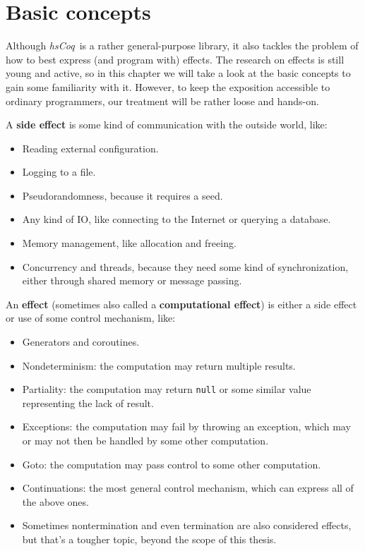 \documentclass[declaration,inz,english,shortabstract]{iithesis}
\newcommand{\libname}{\textit{hsCoq}}
\newcommand{\m}[1]{\texttt{#1}}
\begin{document}
\section{Basic concepts}

Although \libname\ is a rather general-purpose library, it also tackles the problem of how to best express (and program with) effects. The research on effects is still young and active, so in this chapter we will take a look at the basic concepts to gain some familiarity with it. However, to keep the exposition accessible to ordinary programmers, our treatment will be rather loose and hands-on.

A \textbf{side effect} is some kind of communication with the outside world, like:

\begin{itemize}
    \item Reading external configuration.
    \item Logging to a file.
    \item Pseudorandomness, because it requires a seed.
    \item Any kind of IO, like connecting to the Internet or querying a database.
    \item Memory management, like allocation and freeing.
    \item Concurrency and threads, because they need some kind of synchronization, either through shared memory or message passing.
\end{itemize}

An \textbf{effect} (sometimes also called a \textbf{computational effect}) is either a side effect or use of some control mechanism, like:

\begin{itemize}
    \item Generators and coroutines.
    \item Nondeterminism: the computation may return multiple results.
    \item Partiality: the computation may return \m{null} or some similar value representing the lack of result.
    \item Exceptions: the computation may fail by throwing an exception, which may or may not then be handled by some other computation.
    \item Goto: the computation may pass control to some other computation.
    \item Continuations: the most general control mechanism, which can express all of the above ones.
    \item Sometimes nontermination and even termination are also considered effects, but that's a tougher topic, beyond the scope of this thesis.
\end{itemize}
\end{document}
